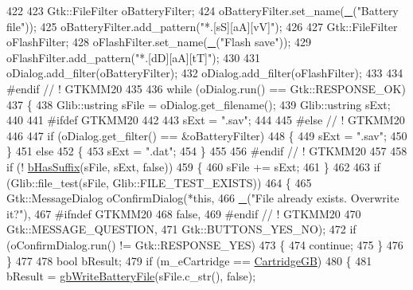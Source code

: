 \begin{DoxyCode}
422 
423   Gtk::FileFilter oBatteryFilter;
424   oBatteryFilter.set\_name(\mbox{\hyperlink{getopt_8c_a86a239addea586602343007a370bf8ad}{\_}}(\textcolor{stringliteral}{"Battery file"}));
425   oBatteryFilter.add\_pattern(\textcolor{stringliteral}{"*.[sS][aA][vV]"});
426 
427   Gtk::FileFilter oFlashFilter;
428   oFlashFilter.set\_name(\mbox{\hyperlink{getopt_8c_a86a239addea586602343007a370bf8ad}{\_}}(\textcolor{stringliteral}{"Flash save"}));
429   oFlashFilter.add\_pattern(\textcolor{stringliteral}{"*.[dD][aA][tT]"});
430 
431   oDialog.add\_filter(oBatteryFilter);
432   oDialog.add\_filter(oFlashFilter);
433 
434 \textcolor{preprocessor}{#endif // ! GTKMM20}
435 
436   \textcolor{keywordflow}{while} (oDialog.run() == Gtk::RESPONSE\_OK)
437   \{
438     Glib::ustring sFile = oDialog.get\_filename();
439     Glib::ustring sExt;
440 
441 \textcolor{preprocessor}{#ifdef GTKMM20}
442 
443     sExt = \textcolor{stringliteral}{".sav"};
444 
445 \textcolor{preprocessor}{#else // ! GTKMM20}
446 
447     \textcolor{keywordflow}{if} (oDialog.get\_filter() == &oBatteryFilter)
448     \{
449       sExt = \textcolor{stringliteral}{".sav"};
450     \}
451     \textcolor{keywordflow}{else}
452     \{
453       sExt = \textcolor{stringliteral}{".dat"};
454     \}
455 
456 \textcolor{preprocessor}{#endif // ! GTKMM20}
457 
458     \textcolor{keywordflow}{if} (! \mbox{\hyperlink{namespace_v_b_a_ad93561fe4528e04192e066e138c3572b}{bHasSuffix}}(sFile, sExt, \textcolor{keyword}{false}))
459     \{
460       sFile += sExt;
461     \}
462 
463     \textcolor{keywordflow}{if} (Glib::file\_test(sFile, Glib::FILE\_TEST\_EXISTS))
464     \{
465       Gtk::MessageDialog oConfirmDialog(*\textcolor{keyword}{this},
466                                         \mbox{\hyperlink{getopt_8c_a86a239addea586602343007a370bf8ad}{\_}}(\textcolor{stringliteral}{"File already exists. Overwrite it?"}),
467 #ifndef GTKMM20
468                                         \textcolor{keyword}{false},
469 #endif \textcolor{comment}{// ! GTKMM20}
470                                         Gtk::MESSAGE\_QUESTION,
471                                         Gtk::BUTTONS\_YES\_NO);
472       \textcolor{keywordflow}{if} (oConfirmDialog.run() != Gtk::RESPONSE\_YES)
473       \{
474         \textcolor{keywordflow}{continue};
475       \}
476     \}
477 
478     \textcolor{keywordtype}{bool} bResult;
479     \textcolor{keywordflow}{if} (m\_eCartridge == \mbox{\hyperlink{class_v_b_a_1_1_window_af580451d3ee7a738a73434858a08fa65a23a8d7e61dfcb4c1935477f7b9b80067}{CartridgeGB}})
480     \{
481       bResult = \mbox{\hyperlink{_g_b_8cpp_a25cad6c0d1059ad4bf219d93d86aa2dd}{gbWriteBatteryFile}}(sFile.c\_str(), \textcolor{keyword}{false});

\end{DoxyCode}
